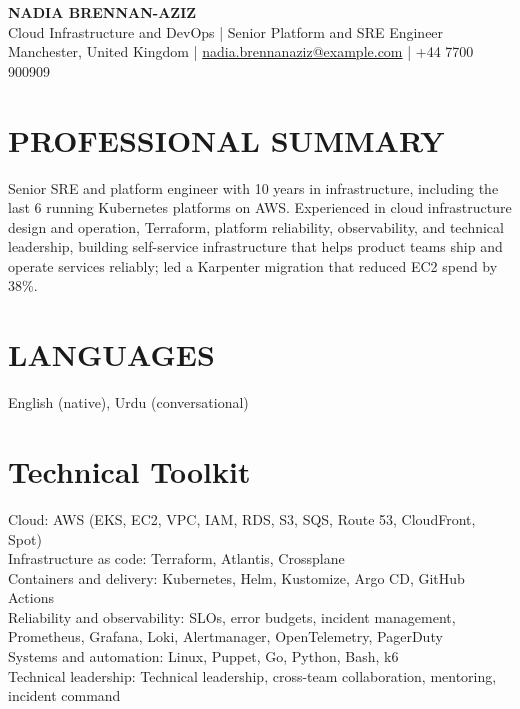 \documentclass[11pt,a4paper]{article}
\begin{document}
\begin{center}
{\Huge\bfseries\color{primarycolor} NADIA BRENNAN-AZIZ}\\[0.35em]
{\large\color{accentcolor} Cloud Infrastructure and DevOps | Senior Platform and SRE Engineer}\\[0.25em]
Manchester, United Kingdom | \href{mailto:nadia.brennanaziz@example.com}{nadia.brennanaziz@example.com} | +44 7700 900909
\end{center}

\section*{PROFESSIONAL SUMMARY}
Senior SRE and platform engineer with 10 years in infrastructure, including the last 6 running Kubernetes platforms on AWS. Experienced in cloud infrastructure design and operation, Terraform, platform reliability, observability, and technical leadership, building self-service infrastructure that helps product teams ship and operate services reliably; led a Karpenter migration that reduced EC2 spend by 38\%.

\section*{LANGUAGES}
English (native), Urdu (conversational)

\section*{Technical Toolkit}
Cloud: AWS (EKS, EC2, VPC, IAM, RDS, S3, SQS, Route 53, CloudFront, Spot)\\
Infrastructure as code: Terraform, Atlantis, Crossplane\\
Containers and delivery: Kubernetes, Helm, Kustomize, Argo CD, GitHub Actions\\
Reliability and observability: SLOs, error budgets, incident management, Prometheus, Grafana, Loki, Alertmanager, OpenTelemetry, PagerDuty\\
Systems and automation: Linux, Puppet, Go, Python, Bash, k6\\
Technical leadership: Technical leadership, cross-team collaboration, mentoring, incident command
\end{document}

